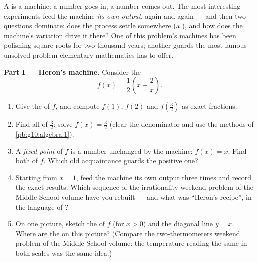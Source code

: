 \begin{problem}
\label{pb:g10:functions:1}
A  is a machine: a number goes in, a number comes out.
The most interesting experiments feed the machine \emph{its own
output}, again and again --- and then two questions dominate:
does the process settle somewhere (a \emph{}), and
how does the machine's variation drive it there? One of this
problem's machines has been polishing square roots for two
thousand years; another guards the most famous unsolved problem
elementary mathematics has to offer.

\medskip
\noindent\textbf{Part I --- Heron's machine.}
Consider the 
\[
f(x) = \frac12\left(x + \frac2x\right).
\]
\begin{enumerate}
  \item Give the  of $f$, and compute $f(1)$, $f(2)$ and
        $f\!\left(\frac32\right)$ as exact fractions.
  \item Find all  of $\frac32$: solve
        $f(x) = \frac32$ (clear the denominator and use the
        methods of \cref{pb:g10:algebra:1}).
  \item A \emph{fixed point} of $f$ is a
        number unchanged by the machine: $f(x) = x$. Find both
         of $f$. Which old acquaintance guards the
        positive one?
  \item Starting from $x = 1$, feed the machine its own output
        three times and record the exact results. Which sequence
        of the irrationality weekend problem of the Middle School volume have you rebuilt --- and what was
        ``Heron's recipe'', in the language of ?
  \item On one picture, sketch the  of $f$ (for $x > 0$)
        and the diagonal line $y = x$. Where are the  on this picture? (Compare
        the two-thermometers weekend problem of the Middle School volume: the temperature reading the same
        in both scales was the same idea.)
\end{enumerate}


\end{problem}
